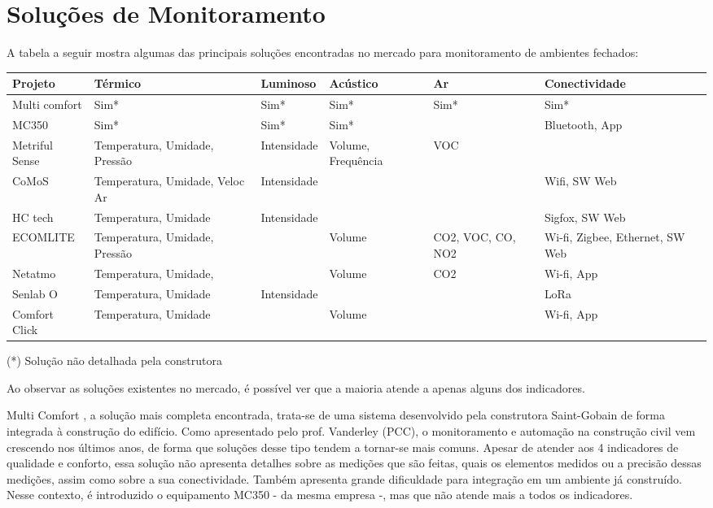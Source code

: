 \documentclass[]{politex}
\begin{document}
\section{Soluções de Monitoramento} %

A tabela a seguir mostra algumas das principais soluções encontradas no mercado para monitoramento de ambientes fechados: 

\begin{center}
\begin{tabular}{ | m{2.5cm} | m{2.4cm}| m{2.2cm} |m{2cm} |m{2.1cm} |m{2.8cm} | } 
\hline
\textbf{Projeto} & \textbf{Térmico} & \textbf{Luminoso} & \textbf{Acústico} & \textbf{Ar} & \textbf{Conectividade} \\ 
\hline
Multi comfort \cite{multicomfort} & Sim* & Sim* & Sim* & Sim* & Sim* \\ \hline
MC350\cite{mc350} & Sim* & Sim* & Sim* & & Bluetooth, App \\
\hline
Metriful Sense\cite{metriful} & Temperatura, Umidade, Pressão & Intensidade & Volume, Frequência & VOC &  \\ \hline
CoMoS\cite{CoMoS} & Temperatura, Umidade, Veloc Ar & Intensidade & & & Wifi, SW Web \\ \hline
HC tech\cite{HCTech} & Temperatura, Umidade & Intensidade & & & Sigfox, SW Web \\ \hline
ECOMLITE \cite{ECOMLITE} & Temperatura, Umidade, Pressão & & Volume & CO2, VOC, CO, NO2 & Wi-fi, Zigbee, Ethernet, SW Web \\ \hline
Netatmo\cite{netatmo} & Temperatura, Umidade, & & Volume & CO2 & Wi-fi, App \\ \hline
Senlab O\cite{Senlab} & Temperatura, Umidade & Intensidade & & & LoRa \\ \hline
Comfort Click\cite{comfortclick} & Temperatura, Umidade & & Volume & & Wi-fi, App  \\ \hline
\end{tabular}
\end{center}

\begin{flushright}
(*) Solução não detalhada pela construtora
\end{flushright}


Ao observar as soluções existentes no mercado, é possível ver que a maioria atende a apenas alguns dos indicadores. 

Multi Comfort \cite{multicomfort}, a solução mais completa encontrada, trata-se de uma sistema desenvolvido pela construtora Saint-Gobain de forma integrada à construção do edifício. Como apresentado pelo prof. Vanderley (PCC), o monitoramento e automação na construção civil vem crescendo nos últimos anos, de forma que soluções desse tipo tendem a tornar-se mais comuns. 
Apesar de atender aos 4 indicadores de qualidade e conforto, essa solução não apresenta detalhes sobre as medições que são feitas, quais os elementos medidos ou a precisão dessas medições, assim como sobre a sua conectividade. Também apresenta grande dificuldade para integração em um ambiente já construído. Nesse contexto, é introduzido o equipamento MC350\cite{mc350} - da mesma empresa -, mas que não atende mais a todos os indicadores. 
\end{document}
